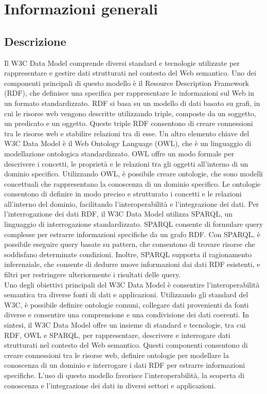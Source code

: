 \section{Informazioni generali}
\subsection{Descrizione}
Il W3C Data Model comprende diversi standard e tecnologie utilizzate per rappresentare e gestire dati strutturati nel contesto del Web semantico. Uno dei componenti principali di questo modello è il Resource Description Framework (RDF), che definisce una specifica per rappresentare le informazioni sul Web in un formato standardizzato. RDF si basa su un modello di dati basato su grafi, in cui le risorse web vengono descritte utilizzando triple, composte da un soggetto, un predicato e un oggetto. Queste triple RDF consentono di creare connessioni tra le risorse web e stabilire relazioni tra di esse. 
Un altro elemento chiave del W3C Data Model è il Web Ontology Language (OWL), che è un linguaggio di modellazione ontologica standardizzato. OWL offre un modo formale per descrivere i concetti, le proprietà e le relazioni tra gli oggetti all'interno di un dominio specifico. Utilizzando OWL, è possibile creare ontologie, che sono modelli concettuali che rappresentano la conoscenza di un dominio specifico. Le ontologie consentono di definire in modo preciso e strutturato i concetti e le relazioni all'interno del dominio, facilitando l'interoperabilità e l'integrazione dei dati.
Per l'interrogazione dei dati RDF, il W3C Data Model utilizza SPARQL, un linguaggio di interrogazione standardizzato. SPARQL consente di formulare query complesse per estrarre informazioni specifiche da un grafo RDF. Con SPARQL, è possibile eseguire query basate su pattern, che consentono di trovare risorse che soddisfano determinate condizioni. Inoltre, SPARQL supporta il ragionamento inferenziale, che consente di dedurre nuove informazioni dai dati RDF esistenti, e filtri per restringere ulteriormente i risultati delle query.\\
Uno degli obiettivi principali del W3C Data Model è consentire l'interoperabilità semantica tra diverse fonti di dati e applicazioni. Utilizzando gli standard del W3C, è possibile definire ontologie comuni, collegare dati provenienti da fonti diverse e consentire una comprensione e una condivisione dei dati coerenti.
In sintesi, il W3C Data Model offre un insieme di standard e tecnologie, tra cui RDF, OWL e SPARQL, per rappresentare, descrivere e interrogare dati strutturati nel contesto del Web semantico. Questi componenti consentono di creare connessioni tra le risorse web, definire ontologie per modellare la conoscenza di un dominio e interrogare i dati RDF per estrarre informazioni specifiche. L'uso di questo modello favorisce l'interoperabilità, la scoperta di conoscenza e l'integrazione dei dati in diversi settori e applicazioni.\\

